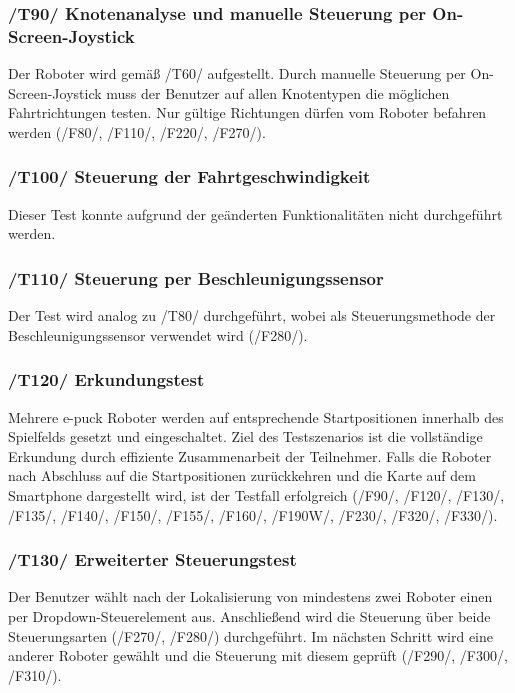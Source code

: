 \documentclass[10pt,a4paper]{article}
\begin{document}
			\subsubsection{/T90/ Knotenanalyse und manuelle Steuerung per On-Screen-Joystick}
			Der Roboter wird gemäß /T60/ aufgestellt. Durch manuelle Steuerung per On-Screen-Joystick muss der
			Benutzer auf allen Knotentypen die möglichen Fahrtrichtungen testen. Nur gültige Richtungen
			dürfen vom Roboter befahren werden (/F80/, /F110/, /F220/, /F270/).
			
			\subsubsection{/T100/ Steuerung der Fahrtgeschwindigkeit}
			Dieser Test konnte aufgrund der ge\"anderten Funktionalit\"aten nicht durchgef\"uhrt werden.
			
			\subsubsection{/T110/ Steuerung per Beschleunigungssensor}
			Der Test wird analog zu /T80/ durchgeführt, wobei als Steuerungsmethode der Beschleunigungssensor
			verwendet wird (/F280/).
			
			\subsubsection{/T120/ Erkundungstest}
			Mehrere e-puck Roboter werden auf entsprechende Startpositionen innerhalb des Spielfelds gesetzt und
			eingeschaltet. Ziel des Testszenarios ist die vollständige Erkundung durch effiziente Zusammenarbeit der Teilnehmer.
			Falls die Roboter nach Abschluss auf die Startpositionen zurückkehren und die Karte auf dem Smartphone dargestellt
			wird, ist der Testfall erfolgreich (/F90/, /F120/, /F130/, /F135/, /F140/,
			/F150/, /F155/, /F160/, /F190W/, /F230/, /F320/, /F330/).
			
			\subsubsection{/T130/ Erweiterter Steuerungstest}
			Der Benutzer wählt nach der Lokalisierung von mindestens zwei Roboter einen per Dropdown-Steuerelement aus.
			Anschließend wird die Steuerung über beide Steuerungsarten (/F270/, /F280/) durchgeführt. Im nächsten
			Schritt wird eine anderer Roboter gewählt und die Steuerung mit diesem geprüft (/F290/, /F300/, /F310/).
			
\end{document}
